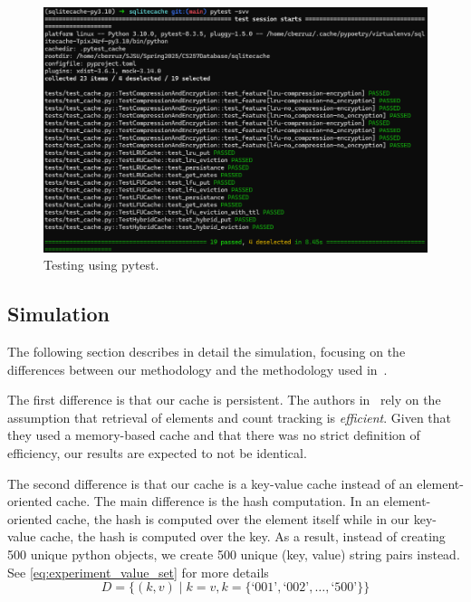 \begin{figure}[!htp]
    \centering
    \includegraphics[width=\columnwidth]{images/testing.png} 
    \caption{Testing using pytest.}
    \label{fig:testing_running}
\end{figure}

\subsection{Simulation\label{sec:simulation}}
The following section describes in detail the simulation, focusing on the differences
between our methodology and the methodology used in~\cite{shah2023ImprovedCacheEviction}.

The first difference is that our cache is persistent.
The authors in~\cite{shah2023ImprovedCacheEviction} rely on the assumption
that retrieval of elements and count tracking is \textit{efficient}. Given
that they used a memory-based cache and that there was no strict definition
of efficiency, our results are expected to not be identical.

The second difference is that our cache is a key-value cache instead
of an element-oriented cache. The main difference is the hash computation.
In an element-oriented cache, the hash is computed over the element itself
while in our key-value cache, the hash is computed over the key.
As a result, instead of creating 500 unique python objects,
we create 500 unique (key, value) string pairs instead. See
\autoref{eq:experiment_value_set} for more details
\begin{equation}
D = \{(k, v) \mid k = v, k = \{\text{`001'}, \text{`002'}, \ldots, \text{`500'}\}\}
\label{eq:experiment_value_set}
\end{equation}

